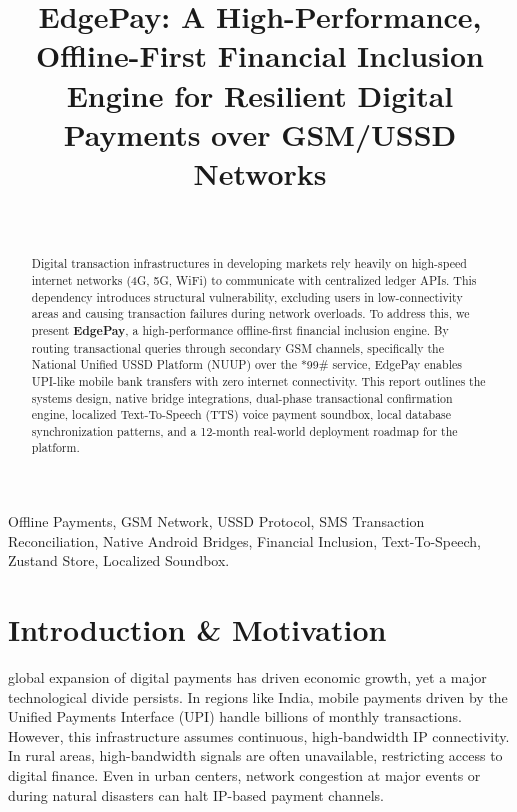 \documentclass[10pt,journal,compsoc]{IEEEtran}
\begin{document}
\title{EdgePay: A High-Performance, Offline-First Financial Inclusion Engine for Resilient Digital Payments over GSM/USSD Networks}

\author{
    \\
}

\maketitle

\begin{abstract}
Digital transaction infrastructures in developing markets rely heavily on high-speed internet networks (4G, 5G, WiFi) to communicate with centralized ledger APIs. This dependency introduces structural vulnerability, excluding users in low-connectivity areas and causing transaction failures during network overloads. To address this, we present \textbf{EdgePay}, a high-performance offline-first financial inclusion engine. By routing transactional queries through secondary GSM channels, specifically the National Unified USSD Platform (NUUP) over the *99\# service, EdgePay enables UPI-like mobile bank transfers with zero internet connectivity. This report outlines the systems design, native bridge integrations, dual-phase transactional confirmation engine, localized Text-To-Speech (TTS) voice payment soundbox, local database synchronization patterns, and a 12-month real-world deployment roadmap for the platform.
\end{abstract}

\begin{IEEEkeywords}
Offline Payments, GSM Network, USSD Protocol, SMS Transaction Reconciliation, Native Android Bridges, Financial Inclusion, Text-To-Speech, Zustand Store, Localized Soundbox.
\end{IEEEkeywords}

\section{Introduction \& Motivation}
 global expansion of digital payments has driven economic growth, yet a major technological divide persists. In regions like India, mobile payments driven by the Unified Payments Interface (UPI) handle billions of monthly transactions. However, this infrastructure assumes continuous, high-bandwidth IP connectivity. In rural areas, high-bandwidth signals are often unavailable, restricting access to digital finance. Even in urban centers, network congestion at major events or during natural disasters can halt IP-based payment channels.
\end{document}
